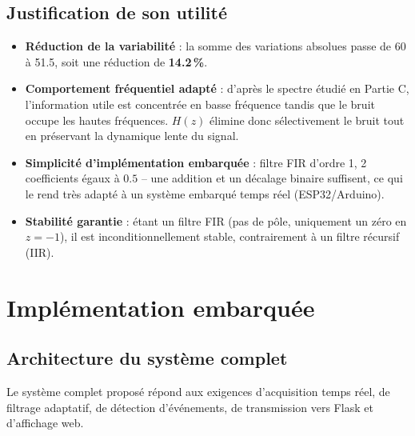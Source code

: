 \documentclass[11pt,a4paper]{article}
\begin{document}
\subsection{Justification de son utilité}

\begin{itemize}[label=--]
    \item \textbf{Réduction de la variabilité} : la somme des variations absolues passe de 60 à 51.5, soit une réduction de \textbf{14.2\,\%}.
    \item \textbf{Comportement fréquentiel adapté} : d'après le spectre étudié en Partie C, l'information utile est concentrée en basse fréquence tandis que le bruit occupe les hautes fréquences. $H(z)$ élimine donc sélectivement le bruit tout en préservant la dynamique lente du signal.
    \item \textbf{Simplicité d'implémentation embarquée} : filtre FIR d'ordre 1, 2 coefficients égaux à $0.5$ -- une addition et un décalage binaire suffisent, ce qui le rend très adapté à un système embarqué temps réel (ESP32/Arduino).
    \item \textbf{Stabilité garantie} : étant un filtre FIR (pas de pôle, uniquement un zéro en $z=-1$), il est inconditionnellement stable, contrairement à un filtre récursif (IIR).
\end{itemize}

\newpage
\section{Implémentation embarquée}

\subsection{Architecture du système complet}

Le système complet proposé répond aux exigences d'acquisition temps réel, de filtrage adaptatif, de détection d'événements, de transmission vers Flask et d'affichage web.
\end{document}
